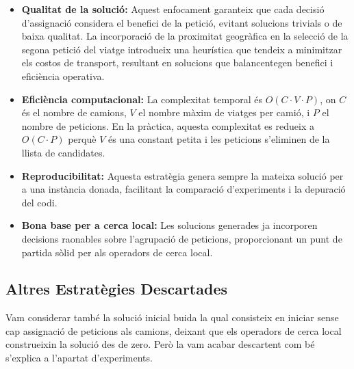 \begin{itemize}
    \item \textbf{Qualitat de la solució:} Aquest enfocament garanteix que cada decisió d'assignació considera el benefici de la petició, evitant solucions trivials o de baixa qualitat. La incorporació de la proximitat geogràfica en la selecció de la segona petició del viatge introdueix una heurística que tendeix a minimitzar els costos de transport, resultant en solucions que balancentegen benefici i eficiència operativa.
    
    \item \textbf{Eficiència computacional:} La complexitat temporal és $O(C \cdot V \cdot P)$, on $C$ és el nombre de camions, $V$ el nombre màxim de viatges per camió, i $P$ el nombre de peticions. En la pràctica, aquesta complexitat es redueix a $O(C \cdot P)$ perquè $V$ és una constant petita i les peticions s'eliminen de la llista de candidates.
    
    \item \textbf{Reproducibilitat:} Aquesta estratègia genera sempre la mateixa solució per a una instància donada, facilitant la comparació d'experiments i la depuració del codi.
    
    \item \textbf{Bona base per a cerca local:} Les solucions generades ja incorporen decisions raonables sobre l'agrupació de peticions, proporcionant un punt de partida sòlid per als operadors de cerca local.
\end{itemize}

\subsection{Altres Estratègies Descartades}

Vam considerar també la solució inicial buida la qual consisteix en iniciar sense cap assignació de peticions als camions, deixant que els operadors de cerca local construeixin la solució des de zero. 
Però la vam acabar descartent com bé s'explica a l'apartat d'experiments.
